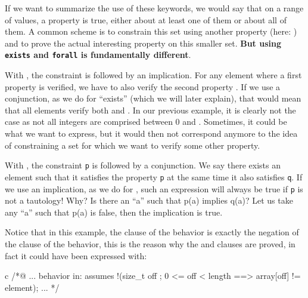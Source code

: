 If we want to summarize the use of these keywords, we would say that on a
range of values, a property is true, either about at least one of them
or about all of them. A common scheme is to constrain this set using
another property (here: ) and to prove the
actual interesting property on this smaller set. \textbf{But using
\texttt{exists} and \texttt{forall} is fundamentally different}.


With ,
the constraint  is followed by an implication.
For any element where a first property  is verified, we have
to also verify the second property . If we use a conjunction,
as we do for ``exists'' (which we will later explain), that would mean that
all elements verify both  and . In our previous
example, it is clearly not the case as not all integers are comprised between
0 and . Sometimes, it could be what we want to express, but
it would then not correspond anymore to the idea of constraining a set for which
we want to verify some other property.


With , the
constraint \texttt{p} is followed by a conjunction. We say there exists
an element such that it satisfies the property \texttt{p} at the same
time it also satisfies \texttt{q}. If we use an implication, as we do
for , such an expression will always be true
if \texttt{p} is not a tautology! Why? Is there an ``a'' such that p(a) implies
q(a)? Let us take any ``a'' such that p(a) is false, then the implication is true.


Notice that in this example, the  clause of the
 behavior is exactly the negation of the 
clause of the  behavior, this is the reason why the
 and  clauses are proved, in fact it
could have been expressed with:


\begin{CodeBlock}{c}
  /*@ ...
    behavior in:
      assumes !(\forall size_t off ; 0 <= off < length ==> array[off] != element);
    ...
  */
\end{CodeBlock}


